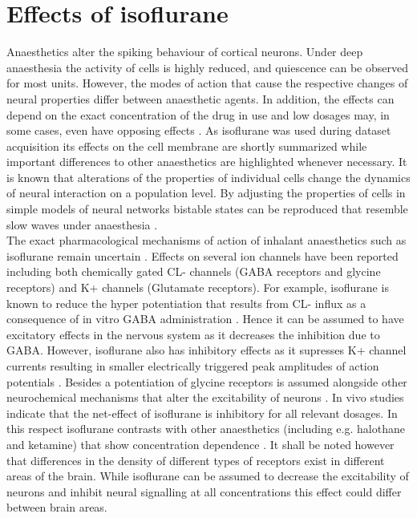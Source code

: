 \section{Effects of isoflurane}
\label{effects_of_anaesthesia}
Anaesthetics alter the spiking behaviour of cortical neurons. Under deep anaesthesia the activity of cells is highly reduced, and quiescence can be observed for most units. However, the modes of action that cause the respective changes of neural properties differ between anaesthetic agents. In addition, the effects can depend on the exact concentration of the drug in use and low dosages may, in some cases, even have opposing effects \parencite{moghadam2019comparative}. As isoflurane was used during dataset acquisition its effects on the cell membrane are shortly summarized while important differences to other anaesthetics are highlighted whenever necessary. It is known that alterations of the properties of individual cells change the dynamics of neural interaction on a population level. By adjusting the properties of cells in simple models of neural networks bistable states can be reproduced that resemble slow waves under anaesthesia \parencite{jercog2017up}.\\
The exact pharmacological mechanisms of action of inhalant anaesthetics such as isoflurane remain uncertain \parencite{miller2020inhalational}. Effects on several ion channels have been reported including both chemically gated CL- channels (GABA receptors and glycine receptors) and K+ channels (Glutamate receptors). For example, isoflurane is known to reduce the hyper potentiation that results from CL- influx as a consequence of in vitro GABA administration \parencite{jenkins1999effects}. Hence it can be assumed to have excitatory effects in the nervous system as it decreases the inhibition due to GABA. However, isoflurane also has inhibitory effects as it supresses K+ channel currents resulting in smaller electrically triggered peak amplitudes of action potentials \parencite{buljubasic1992effects}. Besides a potentiation of glycine receptors is assumed alongside other neurochemical mechanisms that alter the excitability of neurons \parencite{pubchem2020iso}. In vivo studies indicate that the net-effect of isoflurane is inhibitory for all relevant dosages. In this respect isoflurane contrasts with other anaesthetics (including e.g. halothane and ketamine) that show concentration dependence \parencite{moghadam2019comparative}. It shall be noted however that differences in the density of different types of receptors exist in different areas of the brain. While isoflurane can be assumed to decrease the excitability of neurons and inhibit neural signalling at all concentrations this effect could differ between brain areas.\\
